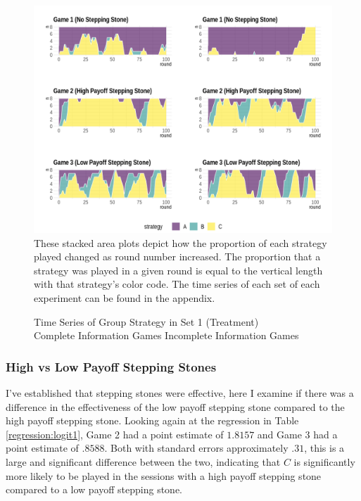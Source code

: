\begin{figure}[H]
\captionsetup{justification=centering}
  \caption[caption]{Time Series of Group Strategy in Set 1 (Treatment)\\\hspace{\textwidth}Complete Information Games \hspace{80pt} Incomplete Information Games}
   \label{fig:Set1}
    \includegraphics[width = \textwidth]{Images/AllAreaPlotSet1_2.png}
    These stacked area plots depict how the proportion of each strategy played changed as round number increased. The proportion that a strategy was played in a given round is equal to the vertical length with that strategy's color code. The time series of each set of each experiment can be found in the appendix. 
\end{figure}



\subsubsection*{High vs Low Payoff Stepping Stones}

I've established that stepping stones were effective, here I examine if there was a difference in the effectiveness of the low payoff stepping stone compared to the high payoff stepping stone. Looking again at the regression in Table \ref{regression:logit1}, Game 2 had a point estimate of $1.8157$ and Game 3 had a point estimate of $.8588$. Both with standard errors approximately $.31$, this is a large and significant difference between the two, indicating that $C$ is significantly more likely to be played in the sessions with a high payoff stepping stone compared to a low payoff stepping stone. 

